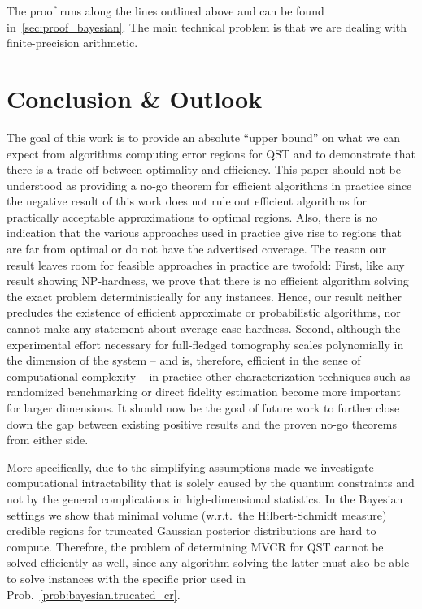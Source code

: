 The proof runs along the lines outlined above and can be found in~\ref{sec:proof_bayesian}.
The main technical problem is that we are dealing with finite-precision arithmetic.

\section{Conclusion \& Outlook}
\label{sec:outlook}

The goal of this work is to provide an absolute ``upper bound'' on what we can expect from algorithms computing error regions for QST and to demonstrate that there is a trade-off between optimality and efficiency.
This paper should not be understood as providing a no-go theorem for efficient algorithms in practice since the negative result of this work does not rule out efficient algorithms for practically acceptable approximations to optimal regions.
Also, there is no indication that the various approaches used in practice give rise to regions that are far from optimal or do not have the advertised coverage.
The reason our result leaves room for feasible approaches in practice are twofold:
First, like any result showing NP-hardness, we prove that there is no efficient algorithm solving the exact problem deterministically for any instances.
Hence, our result neither precludes the existence of efficient approximate or probabilistic algorithms, nor cannot make any statement about average case hardness.
Second, although the experimental effort necessary for full-fledged tomography scales polynomially in the dimension of the system -- and is, therefore, efficient in the sense of computational complexity -- in practice other characterization techniques such as randomized benchmarking or direct fidelity estimation become more important for larger dimensions.
It should now be the goal of future work to further close down the gap between existing positive results and the proven no-go theorems from either side.


More specifically, due to the simplifying assumptions made we investigate computational intractability that is solely caused by the quantum constraints and not by the general complications in high-dimensional statistics.
In the Bayesian settings we show that minimal volume (w.r.t.\ the Hilbert-Schmidt measure) credible regions for truncated Gaussian posterior distributions are hard to compute.
Therefore, the problem of determining MVCR for QST cannot be solved efficiently as well, since any algorithm solving the latter must also be able to solve instances with the specific prior used in Prob.~\ref{prob:bayesian.trucated_cr}.

